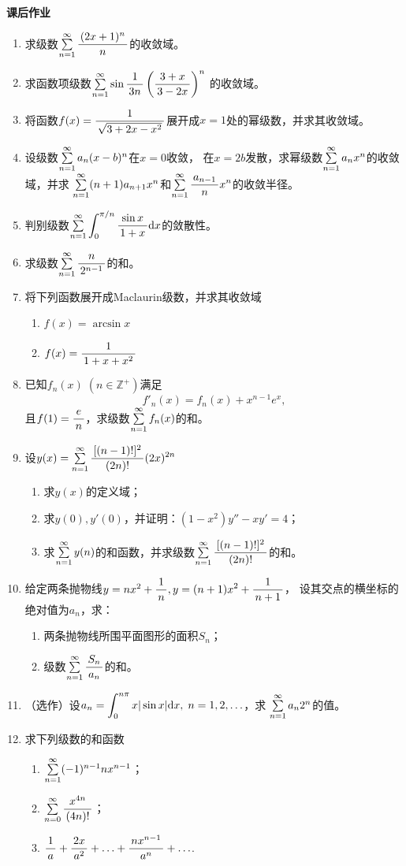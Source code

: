 \begin{ext}
	{\bf 课后作业}
	\begin{enumerate}
	  \item 求级数$\sumn\df{(2x+1)^n}n$的收敛域。
	  \item 求函数项级数$\sum\limits_{n=1}^{\infty}
		\sin\df 1 {3n}\left(\df{3+x}{3-2x}\right)^n$
		的收敛域。
	  \item 将函数$f(x)=\df1{\sqrt{3+2x-x^2}}$展开成$x=1$处的幂级数，并求其收敛域。
	  \item 设级数$\sumn a_n(x-b)^n$在$x=0$收敛，
		在$x=2b$发散，求幂级数$\sumn a_nx^n$的收敛域，并求
		$\sumn(n+1)a_{n+1}x^n$和$\sumn\df{a_{n-1}}nx^n$的收敛半径。 
	  \item 判别级数$\sumn\dint_0^{\pi/n}\df{\sin x}{1+x}\d x$的敛散性。 
	  \item 求级数$\sum\limits_{n=1}^{\infty}\df{n}{2^{n-1}}$的和。
	  \item 将下列函数展开成Maclaurin级数，并求其收敛域
		\begin{enumerate}[(1)]
		  \item $f(x)=\arcsin x$
		  \item $f(x)=\df 1{1+x+x^2}$
		\end{enumerate}
	  \item 已知$f_n(x)\;(n\in\mathbb{Z}^+)$满足
		$$f'_n(x)=f_n(x)+x^{n-1}e^x,$$
		且$f(1)=\df en$，求级数$\sumn f_n(x)$的和。
	  \item 设$y(x)=\sumn\df{[(n-1)!]^2}{(2n)!}(2x)^{2n}$
		\begin{enumerate}[(1)]
		  \item 求$y(x)$的定义域；
		  \item 求$y(0),y'(0)$，并证明：$(1-x^2)y''-xy'=4$；
		  \item 求$\sumn y(n)$的和函数，并求级数$\sumn\df{[(n-1)!]^2}{(2n)!}$的和。
		\end{enumerate}
	  \item 给定两条抛物线$y=nx^2+\df1n,y=(n+1)x^2+\df1{n+1}$，
		设其交点的横坐标的绝对值为$a_n$，求：
		\begin{enumerate}[(1)]
		  \item 两条抛物线所围平面图形的面积$S_n$；
		  \item 级数$\sumn\df{S_n}{a_n}$的和。
		\end{enumerate}
	  \item （选作）设$a_n=\dint_0^{n\pi}x|\sin x|\d x,\;n=1,2,\ldots$，求
		$\sumn{a_n}{2^n}$的值。
	  \item 求下列级数的和函数
		\begin{enumerate}[(1)]
		  \item $\sumn(-1)^{n-1}nx^{n-1}$；
		  \item $\sum\limits_{n=0}^{\infty}\df{x^{4n}}{(4n)!}$；
		  \item $\df1a+\df{2x}{a^2}+\ldots+\df{nx^{n-1}}{a^n}+\ldots$.
		\end{enumerate}
	\end{enumerate}
\end{ext}

